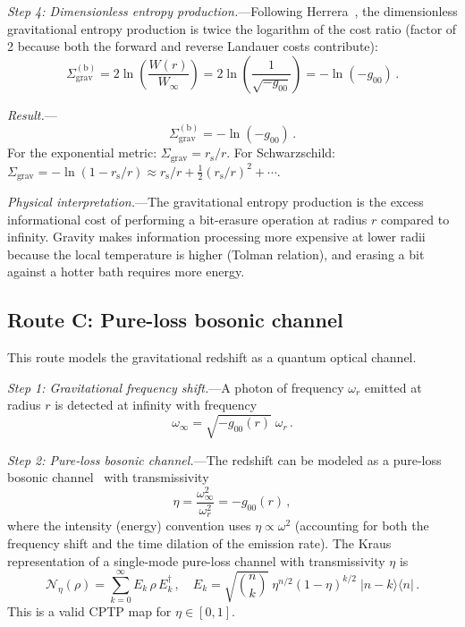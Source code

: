\documentclass[aps,prd,preprint,superscriptaddress,longbibliography]{revtex4-2}
\newcommand{\chan}{\mathcal{N}}
\newcommand{\ket}[1]{|#1\rangle}
\newcommand{\bra}[1]{\langle#1|}
\newcommand{\rs}{r_{\mathrm{s}}}
\newcommand{\Sgrav}{\Sigma_{\mathrm{grav}}}
\begin{document}
\emph{Step 4: Dimensionless entropy production.}---Following
Herrera~\cite{Herrera2020}, the dimensionless gravitational entropy
production is twice the logarithm of the cost ratio (factor of 2
because both the forward and reverse Landauer costs contribute):
\begin{equation}
  \Sgrav^{(\mathrm{b})} = 2\ln\!\left(\frac{W(r)}{W_\infty}\right)
  = 2\ln\!\left(\frac{1}{\sqrt{-g_{00}}}\right)
  = -\ln(-g_{00})\,.
  \label{eq:Sigma_b}
\end{equation}

\emph{Result.}---
\begin{equation}
  \boxed{\Sgrav^{(\mathrm{b})} = -\ln(-g_{00})\,.}
  \label{eq:route_b_result}
\end{equation}
For the exponential metric: $\Sgrav = \rs/r$.  For Schwarzschild:
$\Sgrav = -\ln(1-\rs/r) \approx \rs/r + \frac{1}{2}(\rs/r)^2 + \cdots$.

\emph{Physical interpretation.}---The gravitational entropy production
is the excess informational cost of performing a bit-erasure operation
at radius $r$ compared to infinity.  Gravity makes information
processing more expensive at lower radii because the local temperature
is higher (Tolman relation), and erasing a bit against a hotter bath
requires more energy.

\subsection{Route C: Pure-loss bosonic channel}
\label{sec:routeC}

This route models the gravitational redshift as a quantum optical
channel.

\emph{Step 1: Gravitational frequency shift.}---A photon of frequency
$\omega_r$ emitted at radius $r$ is detected at infinity with frequency
\begin{equation}
  \omega_\infty = \sqrt{-g_{00}(r)}\;\omega_r\,.
  \label{eq:freq_shift}
\end{equation}

\emph{Step 2: Pure-loss bosonic channel.}---The redshift can be modeled
as a pure-loss bosonic channel~\cite{AhmadiFuentes2014} with
transmissivity
\begin{equation}
  \eta = \frac{\omega_\infty^2}{\omega_r^2} = -g_{00}(r)\,,
  \label{eq:eta}
\end{equation}
where the intensity (energy) convention uses $\eta \propto \omega^2$
(accounting for both the frequency shift and the time dilation of the
emission rate).  The Kraus representation of a single-mode pure-loss
channel with transmissivity $\eta$ is~\cite{Weedbrook2012}
\begin{equation}
  \chan_\eta(\rho) = \sum_{k=0}^{\infty} E_k\,\rho\,E_k^\dagger\,,
  \quad
  E_k = \sqrt{\binom{n}{k}}\;\eta^{n/2}(1-\eta)^{k/2}\;\ket{n-k}\bra{n}\,.
  \label{eq:Kraus_loss}
\end{equation}
This is a valid CPTP map for $\eta \in [0,1]$.
\end{document}
